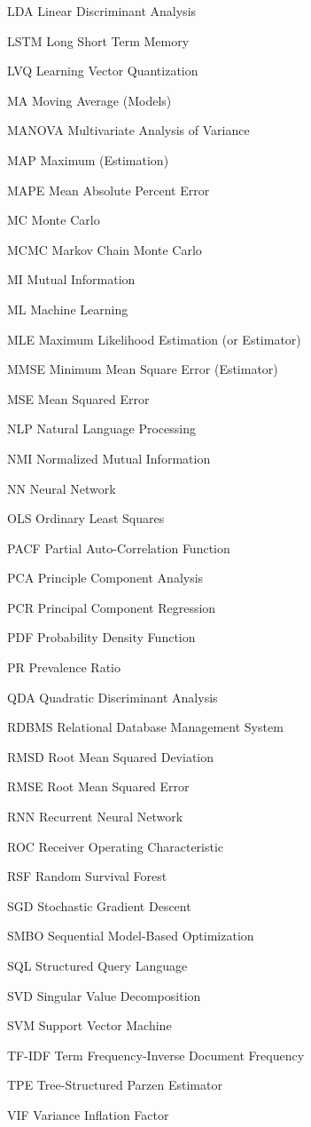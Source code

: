 \begin{symbollist}
  \item[LDA] Linear Discriminant Analysis
  \item[LSTM] Long Short Term Memory
  \item[LVQ] Learning Vector Quantization
  \item[MA] Moving Average (Models)
  \item[MANOVA] Multivariate Analysis of Variance
  \item[MAP] Maximum \aposteriori (Estimation)
  \item[MAPE] Mean Absolute Percent Error
  \item[MC] Monte Carlo
  \item[MCMC] Markov Chain Monte Carlo
  \item[MI] Mutual Information
  \item[ML] Machine Learning
  \item[MLE] Maximum Likelihood Estimation (or Estimator)
  \item[MMSE] Minimum Mean Square Error (Estimator)
  \item[MSE] Mean Squared Error
  \item[NLP] Natural Language Processing
  \item[NMI] Normalized Mutual Information
  \item[NN] Neural Network
  \item[OLS] Ordinary Least Squares
  \item[PACF] Partial Auto-Correlation Function
  \item[PCA] Principle Component Analysis
  \item[PCR] Principal Component Regression
  \item[PDF] Probability Density Function
  \item[PR] Prevalence Ratio
  \item[QDA] Quadratic Discriminant Analysis
  \item[RDBMS] Relational Database Management System
  \item[RMSD] Root Mean Squared Deviation
  \item[RMSE] Root Mean Squared Error
  \item[RNN] Recurrent Neural Network
  \item[ROC] Receiver Operating Characteristic
  \item[RSF] Random Survival Forest
  \item[SGD] Stochastic Gradient Descent
  \item[SMBO] Sequential Model-Based Optimization
  \item[SQL] Structured Query Language
  \item[SVD] Singular Value Decomposition
  \item[SVM] Support Vector Machine
  \item[TF-IDF] Term Frequency-Inverse Document Frequency
  \item[TPE] Tree-Structured Parzen Estimator
  \item[VIF] Variance Inflation Factor
\end{symbollist}
